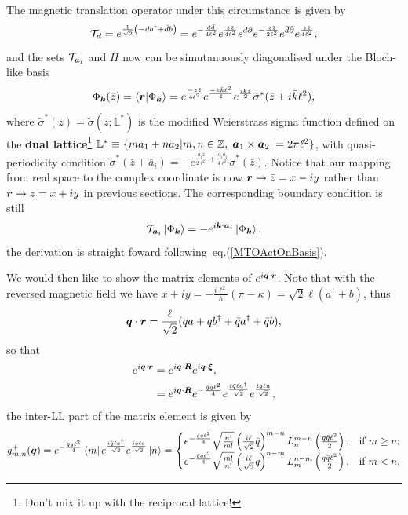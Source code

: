 \documentclass[%
nofootinbib,
 amsmath,amssymb,
 aps,onecolumn,
prb
]{revtex4-2}
\newcommand{\zz}{\bar{z}}
\newcommand{\tilsig}{\tilde{\sigma}}
\newcommand{\tilstarsig}{\tilde{\sigma}^\ast}
\newcommand{\mT}{\mathcal{T}}
\begin{document}
The magnetic translation operator under this circumstance is given by 
\begin{equation}
    \mT_{\vb*{d}}=e^{\frac{1}{\sqrt{2}}\left(-db^\dag+\bar{d}b\right)}
        =e^{-\frac{d\bar{d}}{4\ell^2}}e^{\frac{z\zz}{4\ell^2}}e^{d\partial}e^{-\frac{z\zz}{2\ell^2}}e^{\bar{d} \bar{\partial}}e^{\frac{z\zz}{4\ell^2}},
\end{equation}
and the sets $\mT_{\vb*{a}_i}$ and $H$ now can be simutanuously diagonalised under the Bloch-like basis 
\begin{equation}
    \Phi_{\vb*{k}}(\zz)=\braket{\vb*{r}}{\Phi_{\vb*{k}}}=e^{\frac{-z\zz}{4\ell^2}}e^{\frac{-k\bar{k}\ell^2}{4}}e^{\frac{ik\zz}{2}}\tilstarsig(\zz+i\bar{k}\ell^2),
\end{equation}
where $\tilstarsig(\zz)=\tilsig(\zz;\mathbb{L}^\ast)$ is the modified Weierstrass sigma function defined on the \textbf{dual lattice}\footnote{Don't mix it up with the reciprocal lattice!}
$\mathbb{L}^\ast\equiv\{m\bar{a}_1+n\bar{a}_2|m,n\in\mathbb{Z},|\vb*{a}_1\times\vb*{a}_2|=2\pi\ell^2\}$, with quasi-periodicity condition $\tilstarsig(\zz+\bar{a}_i)=-e^{\frac{a_i\zz}{2\ell^2}+\frac{a_i\bar{a}_i}{4\ell^2}}\tilstarsig(\zz)$.
Notice that our mapping from real space to the complex coordinate is now $\vb*{r}\to \zz=x-iy$ rather than $\vb*{r}\to z=x+iy$ in previous sections. The corresponding boundary condition is still
\begin{equation}
    \mT_{\vb*{a}_i}\ket{\Phi_{\vb*{k}}}=-e^{i\vb*{k}\cdot\vb*{a}_i}\ket{\Phi_{\vb*{k}}},
\end{equation}
the derivation is straight foward following~eq.(\ref{MTOActOnBasis}). \par 
We would then like to show the matrix elements of $e^{i\vb*{q}\cdot\vb*{r}}$. Note that with the reversed magnetic field we have $x+iy=-\frac{i\ell^2}{\hbar}(\pi-\kappa)=\sqrt{2}\ell(a^\dag+b)$, thus 
\begin{equation}
    \vb*{q}\cdot\vb*{r}=\frac{\ell}{\sqrt{2}}(qa+qb^\dag+\bar{q}a^\dag+\bar{q}b),
\end{equation}
so that
\begin{align}
    e^{i\vb*{q}\cdot\vb*{r}}&=e^{i\vb*{q}\cdot\vb*{R}}e^{i\vb*{q}\cdot\vb*{\xi}},\nonumber\\ 
    &=e^{i\vb*{q}\cdot\vb*{R}}e^{-\frac{\bar{q}q\ell^2}{4}}e^{\frac{i\bar{q}\ell a^\dag}{\sqrt{2}}}e^{\frac{iq\ell a}{\sqrt{2}}},
\end{align}
the inter-LL part of the matrix element is given by 
\begin{equation}
    g^+_{m,n}(\vb*{q})=e^{-\frac{\bar{q}q\ell^2}{4}}\bra{m}e^{\frac{i\bar{q}\ell a^\dag}{\sqrt{2}}}e^{\frac{iq\ell a}{\sqrt{2}}}\ket{n}=
    \begin{cases}
    e^{-\frac{\bar{q}q\ell^2}{4}}\sqrt{\frac{n!}{m!}}\left(\frac{i\ell}{\sqrt{2}}\bar{q}\right)^{m-n}L_{n}^{m-n}\left(\frac{q\bar{q}\ell^2}{2}\right),
    & \text{if } m\ge n;\\
    e^{-\frac{\bar{q}q\ell^2}{4}}\sqrt{\frac{m!}{n!}}\left(\frac{i\ell}{\sqrt{2}}q\right)^{n-m}L_{m}^{n-m}\left(\frac{q\bar{q}\ell^2}{2}\right),
    & \text{if } m< n,
    \end{cases}
\end{equation}
\end{document}
